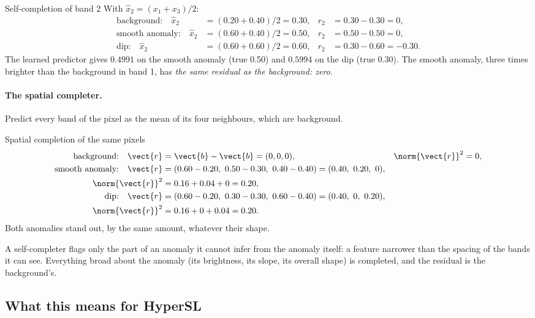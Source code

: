 \begin{worked}[label={we:hsldetect:self}]{Self-completion of band 2}
With $\hat x_2=(x_1+x_3)/2$:
\begin{align*}
\text{background:}\quad \hat x_2 &= (0.20+0.40)/2 = 0.30, & r_2 &= 0.30-0.30 = 0,\\
\text{smooth anomaly:}\quad \hat x_2 &= (0.60+0.40)/2 = 0.50, & r_2 &= 0.50-0.50 = 0,\\
\text{dip:}\quad \hat x_2 &= (0.60+0.60)/2 = 0.60, & r_2 &= 0.30-0.60 = -0.30 .
\end{align*}
The learned predictor gives $0.4991$ on the smooth anomaly (true 0.50) and $0.5994$ on the dip (true 0.30)\tagC. The smooth
anomaly, three times brighter than the background in band 1, has \emph{the same residual as the background: zero}.
\end{worked}

\paragraph{The spatial completer.} Predict every band of the pixel as the mean of its four neighbours, which are
background.
\begin{worked}[label={we:hsldetect:spatial}]{Spatial completion of the same pixels}
\begin{align*}
\text{background:}\quad \vect{r} &= \vect{b}-\vect{b} = (0,0,0), & \norm{\vect{r}}^2 &= 0,\\
\text{smooth anomaly:}\quad \vect{r} &= (0.60-0.20,\ 0.50-0.30,\ 0.40-0.40) = (0.40,\ 0.20,\ 0),\\
\norm{\vect{r}}^2 &= 0.16+0.04+0 = 0.20,\\
\text{dip:}\quad \vect{r} &= (0.60-0.20,\ 0.30-0.30,\ 0.60-0.40) = (0.40,\ 0,\ 0.20),\\
\norm{\vect{r}}^2 &= 0.16+0+0.04 = 0.20 .
\end{align*}
Both anomalies stand out, by the same amount, whatever their shape\tagC.
\end{worked}

\begin{keypoint}
A self-completer flags only the part of an anomaly it cannot infer from the anomaly itself: a feature narrower than the
spacing of the bands it can see. Everything broad about the anomaly (its brightness, its slope, its overall shape) is
completed, and the residual is the background's.
\end{keypoint}

\subsection{What this means for HyperSL}

